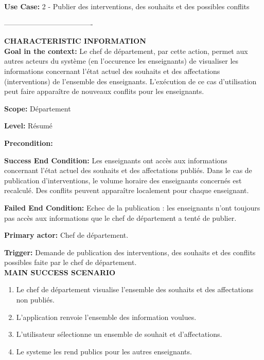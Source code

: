  \noindent\textbf{Use Case:} 2 - Publier des interventions, des souhaits et des possibles conflits

 \noindent\--------------------------------------

 \noindent\textbf{CHARACTERISTIC INFORMATION}\\

 \noindent \textbf{Goal in the context:}
 Le chef de département, par cette action, permet aux autres acteurs du système (en l'occurence les enseignants) de visualiser les informations concernant l'état actuel des souhaits et des affectations (interventions) de l'ensemble des enseignants. L'exécution de ce cas d'utilisation peut faire apparaître de nouveaux conflits pour les enseignants.

 \noindent\textbf{Scope:}
 Département

 \noindent\textbf{Level:}
 Résumé

 \noindent\textbf{Precondition:}
 \

 \noindent\textbf{Success End Condition:}
 Les enseignants ont accès aux informations concernant l'état actuel des souhaits et des affectations publiés. Dans le cas de publication d'interventions, le volume horaire des enseignants concernés est recalculé. Des conflits peuvent apparaître localement pour chaque enseignant.

 \noindent\textbf{Failed End Condition:}
 Echec de la publication : les enseignants n'ont toujours pas accès aux informations que le chef de département a tenté de publier.

 \noindent\textbf{Primary actor:}
 Chef de département.

 \noindent\textbf{Trigger:}
 Demande de publication des interventions, des souhaits et des conflits possibles faite par le chef de département.\\

 \noindent\textbf{MAIN SUCCESS SCENARIO}
 \begin{enumerate}
 \item Le chef de département visualise l'ensemble des souhaits et des affectations non publiés.
 \item L'application renvoie l'ensemble des information voulues.
 \item L'utilisateur sélectionne un ensemble de souhait et d'affectations.
 \item Le systeme les rend publics pour les autres enseignants.\\
 \end{enumerate}

